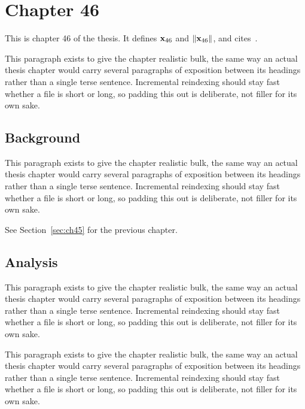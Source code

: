 \section{Chapter 46}
\label{sec:ch46}

This is chapter 46 of the thesis. It defines $\mathbf{x}_{46}$ and $\lVert \mathbf{x}_{46} \rVert$, and cites~\cite{ref1}.

This paragraph exists to give the chapter realistic bulk, the same way an actual thesis chapter would carry several paragraphs of exposition between its headings rather than a single terse sentence. Incremental reindexing should stay fast whether a file is short or long, so padding this out is deliberate, not filler for its own sake.

\subsection{Background}
\label{sec:ch46:background}

This paragraph exists to give the chapter realistic bulk, the same way an actual thesis chapter would carry several paragraphs of exposition between its headings rather than a single terse sentence. Incremental reindexing should stay fast whether a file is short or long, so padding this out is deliberate, not filler for its own sake.

See Section~\ref{sec:ch45} for the previous chapter.

\subsection{Analysis}
\label{sec:ch46:analysis}

This paragraph exists to give the chapter realistic bulk, the same way an actual thesis chapter would carry several paragraphs of exposition between its headings rather than a single terse sentence. Incremental reindexing should stay fast whether a file is short or long, so padding this out is deliberate, not filler for its own sake.

This paragraph exists to give the chapter realistic bulk, the same way an actual thesis chapter would carry several paragraphs of exposition between its headings rather than a single terse sentence. Incremental reindexing should stay fast whether a file is short or long, so padding this out is deliberate, not filler for its own sake.
